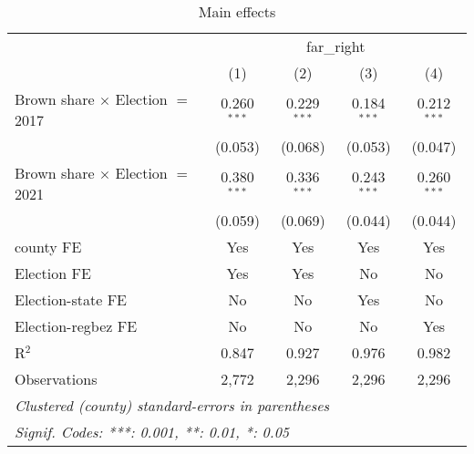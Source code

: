 \begin{table}[htbp]
   \caption{Main effects}
   \centering
   \begin{tabular}{lcccc}
      \tabularnewline \midrule \midrule
       & \multicolumn{4}{c}{far\_right}\\
                                              & (1)           & (2)           & (3)           & (4)\\  
      Brown share $\times$ Election $=$ 2017  & 0.260$^{***}$ & 0.229$^{***}$ & 0.184$^{***}$ & 0.212$^{***}$\\   
                                              & (0.053)       & (0.068)       & (0.053)       & (0.047)\\   
      Brown share $\times$ Election $=$ 2021  & 0.380$^{***}$ & 0.336$^{***}$ & 0.243$^{***}$ & 0.260$^{***}$\\   
                                              & (0.059)       & (0.069)       & (0.044)       & (0.044)\\   
      county FE                               & Yes           & Yes           & Yes           & Yes\\  
      Election FE                             & Yes           & Yes           & No            & No\\  
      Election-state FE                       & No            & No            & Yes           & No\\  
      Election-regbez FE                      & No            & No            & No            & Yes\\  
      R$^2$                                   & 0.847         & 0.927         & 0.976         & 0.982\\  
      Observations                            & 2,772         & 2,296         & 2,296         & 2,296\\  
      \midrule \midrule
      \multicolumn{5}{l}{\emph{Clustered (county) standard-errors in parentheses}}\\
      \multicolumn{5}{l}{\emph{Signif. Codes: ***: 0.001, **: 0.01, *: 0.05}}\\
   \end{tabular}
\end{table}


